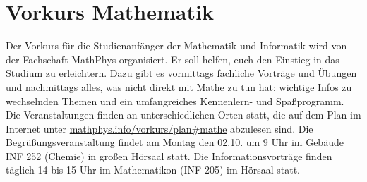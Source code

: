 \section{Vorkurs Mathematik}
\label{vkmathe}
Der Vorkurs für die Studienanfänger der Mathematik und Informatik wird von der
Fachschaft MathPhys organisiert. Er soll helfen, euch den Einstieg in das
Studium zu erleichtern. Dazu gibt es vormittags fachliche Vorträge und Übungen
und nachmittags alles, was nicht direkt mit Mathe zu tun hat: wichtige Infos zu
wechselnden Themen und ein umfangreiches Kennenlern- und Spaßprogramm. Die
Veranstaltungen finden an unterschiedlichen Orten statt, die auf dem Plan im
Internet unter \url{mathphys.info/vorkurs/plan\#mathe}
abzulesen sind. Die Begrüßungsveranstaltung findet am Montag den 02.10. um 9
Uhr im Gebäude \gls{INF} 252 (Chemie) in großen Hörsaal statt. Die
Informationsvorträge finden täglich 14 bis 15 Uhr im Mathematikon
(\gls{INF} 205) im Hörsaal statt.
